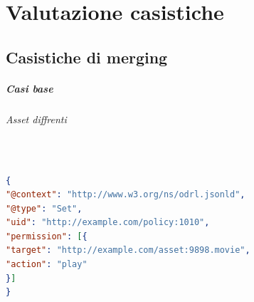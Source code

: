 \documentclass[12pt,a4paper,twoside]{book}
\begin{document}
\chapter{Valutazione casistiche}
\section{Casistiche di merging}
\paragraph{Casi base}
\subparagraph{Asset diffrenti}\mbox{}\\

\begin{lstlisting}[language=json,firstnumber=1,caption={La policy 1010 permette di riprodurre l'asset 9898.movie a chiunque},captionpos=b]
{
"@context": "http://www.w3.org/ns/odrl.jsonld",
"@type": "Set",
"uid": "http://example.com/policy:1010",
"permission": [{
"target": "http://example.com/asset:9898.movie",
"action": "play"
}]
}

\end{lstlisting}
\end{document}
